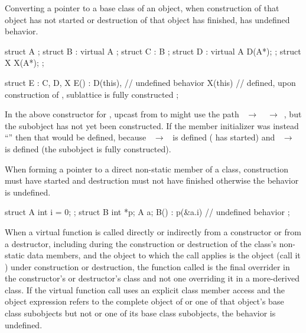 
\pnum
Converting a pointer to a base class of an object,
when construction of that object has not started
or destruction of that object has finished,
has undefined behavior.

\pnum
\begin{example}
\begin{codeblock}
struct A { };
struct B : virtual A { };
struct C : B { };
struct D : virtual A { D(A*); };
struct X { X(A*); };

struct E : C, D, X {
  E() : D(this),    // undefined behavior
  X(this) {}        // defined, upon construction of ,  sublattice is fully constructed
};
\end{codeblock}
In the above constructor for ,
upcast from  to 
might use the path
~$\rightarrow$~~$\rightarrow$~,
but the  subobject has
not yet been constructed.
If the member initializer was instead
``''
then that would be defined,
because ~$\rightarrow$~ is defined
( has started) and
~$\rightarrow$~ is defined
(the  subobject is fully constructed).
\end{example}


\pnum
When forming a pointer to
a direct non-static member of a class,
construction must have started
and destruction must not have finished
otherwise the behavior is undefined.

\pnum
\begin{example}
\begin{codeblock}
struct A {
  int i = 0;
};
struct B {
  int *p;
  A a;
  B() : p(&a.i) {}  // undefined behavior
};
\end{codeblock}
\end{example}


\pnum
When a virtual function is called directly or indirectly
from a constructor or from a destructor,
including during the construction or destruction
of the class's non-static data members,
and the object to which the call applies
is the object (call it ) under construction or destruction,
the function called is the final overrider in the constructor's or destructor's class
and not one overriding it in a more-derived class.
If the virtual function call uses an explicit class member access
and the object expression refers to the complete object of 
or one of that object's base class subobjects
but not  or one of its base class subobjects,
the behavior is undefined.

